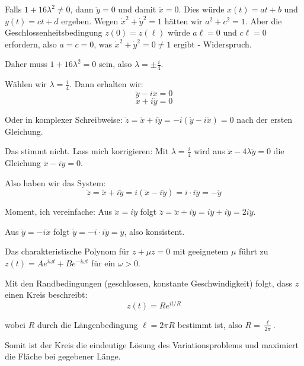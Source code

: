 \documentclass{article}
\begin{document}
Falls $1 + 16\lambda^2 \neq 0$, dann $\ddot{y} = 0$ und damit $\ddot{x} = 0$. Dies würde $x(t) = at + b$ und $y(t) = ct + d$ ergeben. Wegen $\dot{x}^2 + \dot{y}^2 = 1$ hätten wir $a^2 + c^2 = 1$. Aber die Geschlossenheitsbedingung $z(0) = z(\ell)$ würde $a\ell = 0$ und $c\ell = 0$ erfordern, also $a = c = 0$, was $\dot{x}^2 + \dot{y}^2 = 0 \neq 1$ ergibt - Widerspruch.

Daher muss $1 + 16\lambda^2 = 0$ sein, also $\lambda = \pm\frac{i}{4}$.

Wählen wir $\lambda = \frac{i}{4}$. Dann erhalten wir:
$$\ddot{y} - i\ddot{x} = 0$$
$$\ddot{x} + i\ddot{y} = 0$$

Oder in komplexer Schreibweise: $\ddot{z} = \ddot{x} + i\ddot{y} = -i(\ddot{y} - i\ddot{x}) = 0$ nach der ersten Gleichung.

Das stimmt nicht. Lass mich korrigieren: Mit $\lambda = \frac{i}{4}$ wird aus $\ddot{x} - 4\lambda\ddot{y} = 0$ die Gleichung $\ddot{x} - i\ddot{y} = 0$.

Also haben wir das System:
$$\ddot{z} = \ddot{x} + i\ddot{y} = i(\ddot{x} - i\ddot{y}) = i \cdot i\ddot{y} = -\ddot{y}$$

Moment, ich vereinfache: Aus $\ddot{x} = i\ddot{y}$ folgt $\ddot{z} = \ddot{x} + i\ddot{y} = i\ddot{y} + i\ddot{y} = 2i\ddot{y}$.

Aus $\ddot{y} = -i\ddot{x}$ folgt $\ddot{y} = -i \cdot i\ddot{y} = \ddot{y}$, also konsistent.

Das charakteristische Polynom für $\ddot{z} + \mu z = 0$ mit geeignetem $\mu$ führt zu $z(t) = Ae^{i\omega t} + Be^{-i\omega t}$ für ein $\omega > 0$.

Mit den Randbedingungen (geschlossen, konstante Geschwindigkeit) folgt, dass $z$ einen Kreis beschreibt:
$$z(t) = Re^{it/R}$$

wobei $R$ durch die Längenbedingung $\ell = 2\pi R$ bestimmt ist, also $R = \frac{\ell}{2\pi}$.

Somit ist der Kreis die eindeutige Lösung des Variationsproblems und maximiert die Fläche bei gegebener Länge.
\end{document}
